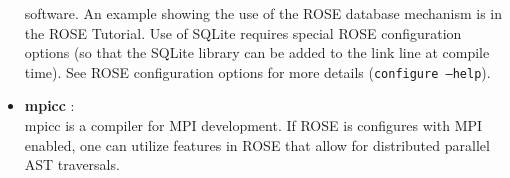 \begin{itemize}
          software. %
          An example showing the use of the ROSE database mechanism is in the ROSE
          Tutorial. Use of SQLite requires special ROSE configuration options (so that
          the SQLite library can be added to the link line at compile time).  See ROSE
          configuration options for more details ({\tt configure --help}).
   \item {\bf mpicc} : \\
          mpicc is a compiler for MPI development. If ROSE is configures with MPI
          enabled, one can utilize features in ROSE that allow for distributed
          parallel AST traversals.
\end{itemize}



